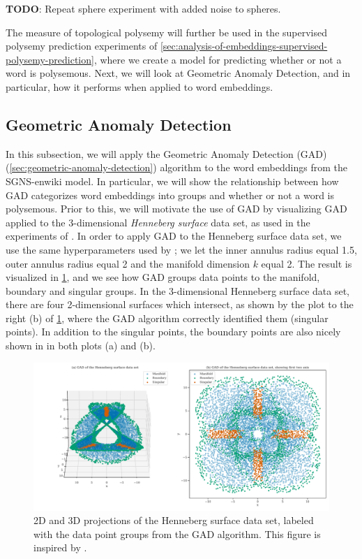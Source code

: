 \textbf{TODO}: Repeat sphere experiment with added noise to spheres.

The measure of topological polysemy will further be used in the supervised polysemy prediction experiments of \cref{sec:analysis-of-embeddings-supervised-polysemy-prediction}, where we create a model for predicting whether or not a word is polysemous. Next, we will look at Geometric Anomaly Detection, and in particular, how it performs when applied to word embeddings.

\subsection{Geometric Anomaly Detection}
\label{sec:analysis-of-embeddings-geometric-anomaly-detection}
In this subsection, we will apply the Geometric Anomaly Detection (GAD) (\cref{sec:geometric-anomaly-detection}) algorithm to the word embeddings from the SGNS-enwiki model. In particular, we will show the relationship between how GAD categorizes word embeddings into groups and whether or not a word is polysemous. Prior to this, we will motivate the use of GAD by visualizing GAD applied to the 3-dimensional \textit{Henneberg surface} data set, as used in the experiments of \cite{stolz2020geometric}. In order to apply GAD to the Henneberg surface data set, we use the same hyperparameters used by \cite{stolz2020geometric}; we let the inner annulus radius equal 1.5, outer annulus radius equal 2 and the manifold dimension $k$ equal 2. The result is visualized in \cref{fig:gad-henneberg-3d}, and we see how GAD groups data points to the manifold, boundary and singular groups. In the 3-dimensional Henneberg surface data set, there are four 2-dimensional surfaces which intersect, as shown by the plot to the right (b) of \cref{fig:gad-henneberg-3d}, where the GAD algorithm correctly identified them (singular points). In addition to the singular points, the boundary points are also nicely shown in in both plots (a) and (b).
\begin{figure}[H]
    \centering
    \includegraphics[width=\textwidth]{thesis/figures/gad-henneberg-3d.pdf}
    \caption{2D and 3D projections of the Henneberg surface data set, labeled with the data point groups from the GAD algorithm. This figure is inspired by \cite[Figure 3]{stolz2020geometric}.}
    \label{fig:gad-henneberg-3d}
\end{figure}

